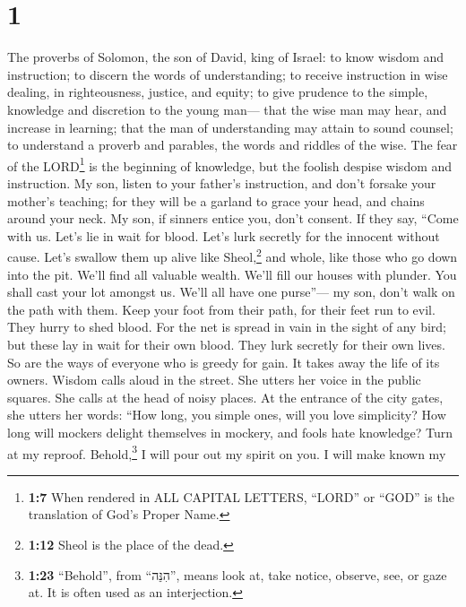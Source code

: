 \hypertarget{section}{%
\section{1}\label{section}}

 The proverbs of Solomon, the son of David, king of
Israel:  to know wisdom and instruction; to discern the
words of understanding;  to receive instruction in wise
dealing, in righteousness, justice, and equity;  to give
prudence to the simple, knowledge and discretion to the young man---
 that the wise man may hear, and increase in learning;
that the man of understanding may attain to sound counsel;
 to understand a proverb and parables, the words and
riddles of the wise.  The fear of the LORD\footnote{\textbf{1:7}
  When rendered in ALL CAPITAL LETTERS, ``LORD'' or ``GOD'' is the
  translation of God's Proper Name.} is the beginning of knowledge, but
the foolish despise wisdom and instruction.  My son,
listen to your father's instruction, and don't forsake your mother's
teaching;  for they will be a garland to grace your head,
and chains around your neck.  My son, if sinners entice
you, don't consent.  If they say, ``Come with us. Let's
lie in wait for blood. Let's lurk secretly for the innocent without
cause.  Let's swallow them up alive like
Sheol,\footnote{\textbf{1:12} Sheol is the place of the dead.} and
whole, like those who go down into the pit.  We'll find
all valuable wealth. We'll fill our houses with plunder. 
You shall cast your lot amongst us. We'll all have one purse''---
 my son, don't walk on the path with them. Keep your foot
from their path,  for their feet run to evil. They hurry
to shed blood.  For the net is spread in vain in the
sight of any bird;  but these lay in wait for their own
blood. They lurk secretly for their own lives.  So are
the ways of everyone who is greedy for gain. It takes away the life of
its owners.  Wisdom calls aloud in the street. She utters
her voice in the public squares.  She calls at the head
of noisy places. At the entrance of the city gates, she utters her
words:  ``How long, you simple ones, will you love
simplicity? How long will mockers delight themselves in mockery, and
fools hate knowledge?  Turn at my reproof.
Behold,\footnote{\textbf{1:23} ``Behold'', from ``הִנֵּה'', means look
  at, take notice, observe, see, or gaze at. It is often used as an
  interjection.} I will pour out my spirit on you. I will make known my
